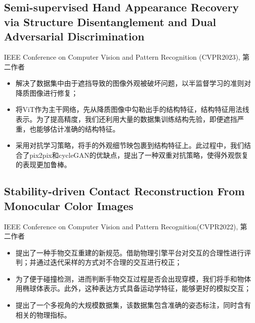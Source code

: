 \documentclass{resume}
\begin{document}
\subsection{\textbf{Semi-supervised Hand Appearance Recovery via Structure Disentanglement and Dual Adversarial Discrimination}}
IEEE Conference on Computer Vision and Pattern Recognition (CVPR2023), 第二作者
\begin{itemize}
  \item 解决了数据集中由于遮挡导致的图像外观被破坏问题，以半监督学习的准则对降质图像进行修复；
  \item 将ViT作为主干网络，先从降质图像中勾勒出手的结构特征，结构特征用法线表示。为了提高精度，我们还利用大量的数据集训练结构先验，即便遮挡严重，也能够估计准确的结构特征。
  \item 采用对抗学习策略，将手的外观细节映包裹到结构特征上。此过程中，我们结合了pix2pix和cycleGAN的优缺点，提出了一种双重对抗策略，使得外观恢复的表现更加鲁棒。
\end{itemize}

\subsection{\textbf{Stability-driven Contact Reconstruction From Monocular Color Images}}
IEEE Conference on Computer Vision and Pattern Recognition(CVPR2022),  第二作者
\begin{itemize}
  \item 提出了一种手物交互重建的新规范。借助物理引擎平台对交互的合理性进行评判；并通过迭代采样的方式对不合理的交互进行校正；
  \item 为了便于碰撞检测，进而判断手物交互过程是否会出现穿模，我们将手和物体用椭球体表示。此外，这种表达方式具备运动学特征，能够更好的模拟交互；
  \item 提出了一个多视角的大规模数据集，该数据集包含准确的姿态标注，同时含有相关的物理指标。
\end{itemize}


\end{document}
